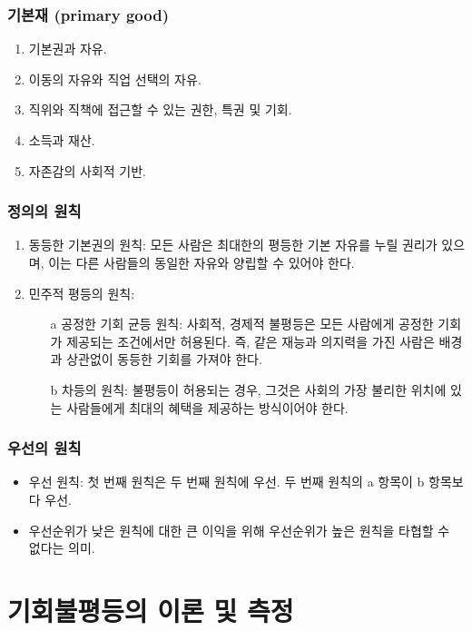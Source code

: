 \documentclass[aspectratio=169,xcolor=dvipsnames,handout]{beamer}
\begin{document}
\begin{frame}[<+->]
\frametitle{기본재 (primary good)}
    \begin{enumerate}
            \item  기본권과 자유.
            \item  이동의 자유와 직업 선택의 자유.
            \item  직위와 직책에 접근할 수 있는 권한, 특권 및 기회.
            \item  소득과 재산.
            \item  자존감의 사회적 기반.
    \end{enumerate}
\end{frame}

\begin{frame}[<+->]
\frametitle{정의의 원칙}
    \begin{enumerate}
        \item  동등한 기본권의 원칙: 모든 사람은 최대한의 평등한 기본 자유를 누릴 권리가 있으며, 이는 다른 사람들의 동일한 자유와 양립할 수 있어야 한다.
        \item  민주적 평등의 원칙: 
        \begin{itemize}
            \item[a] 공정한 기회 균등 원칙: 사회적, 경제적 불평등은 모든 사람에게 공정한 기회가 제공되는 조건에서만 허용된다. 즉, 같은 재능과 의지력을 가진 사람은 배경과 상관없이 동등한 기회를 가져야 한다.
            \item[b] 차등의 원칙: 불평등이 허용되는 경우, 그것은 사회의 가장 불리한 위치에 있는 사람들에게 최대의 혜택을 제공하는 방식이어야 한다.
        \end{itemize}
    \end{enumerate}
\end{frame}

\begin{frame}[<+->]
\frametitle{우선의 원칙}
    \begin{itemize}
        \item 우선 원칙: 첫 번째 원칙은 두 번째 원칙에 우선. 두 번째 원칙의 a 항목이 b 항목보다 우선.
        \item 우선순위가 낮은 원칙에 대한 큰 이익을 위해 우선순위가 높은 원칙을 타협할 수 없다는 의미.
    \end{itemize}
\end{frame}

\section{기회불평등의 이론 및 측정}%
\end{document}
